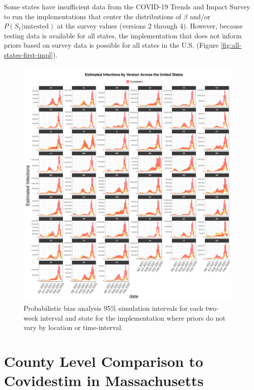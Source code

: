 \documentclass[12pt,twoside]{smiththesis}
\begin{document}
Some states have insufficient data from the COVID-19 Trends and Impact Survey to run the implementations that center the distributions of \(\beta\) and/or \(P(S_1|\text{untested})\) at the survey values (versions 2 through 4). However, because testing data is available for all states, the implementation that does not inform priors based on survey data is possible for all states in the U.S. (Figure \ref{fig:all-states-first-impl}).
\begin{figure}

{\centering \includegraphics[width=1\linewidth]{figure/all-states-first-impl} 

}

\caption{\label{fig:all-states-first-impl}  Probabilistic bias analysis 95\% simulation intervals for each two-week interval and state for the implementation where priors do not vary by location or time-interval.}\label{fig:unnamed-chunk-110}
\end{figure}
\hypertarget{county-level-comparison-to-covidestim-in-massachusetts}{%
\section{County Level Comparison to Covidestim in Massachusetts}\label{county-level-comparison-to-covidestim-in-massachusetts}}
\end{document}
